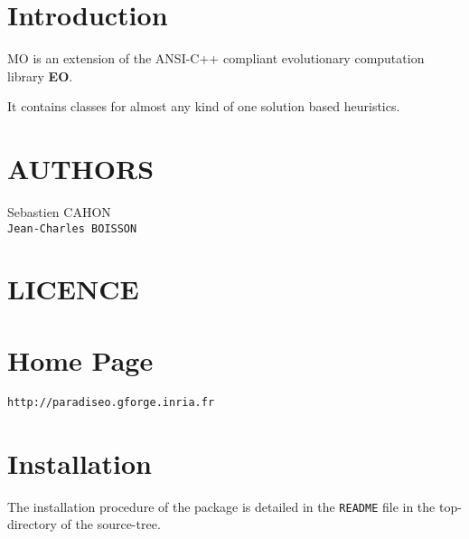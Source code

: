 \section{Introduction}\label{main_Introduction}
MO is an extension of the ANSI-C++ compliant evolutionary computation library {\bf EO}. \par
 It contains classes for almost any kind of one solution based heuristics.\section{AUTHORS}\label{main_authors}
\begin{TabularC}{1}
\hline
Sebastien CAHON  \\\hline
{\tt Jean-Charles BOISSON}  \\\hline
\end{TabularC}
\section{LICENCE}\label{main_LICENCE}
\section{Home Page}\label{main_Paradiseo}
{\tt http://paradiseo.gforge.inria.fr}\section{Installation}\label{main_Installation}
The installation procedure of the package is detailed in the {\tt README} file in the top-directory of the source-tree. 